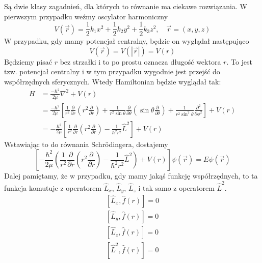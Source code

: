 Są dwie klasy zagadnień, dla których to równanie ma ciekawe rozwiązania.
W pierwszym przypadku weźmy oscylator harmoniczny
\begin{equation*}
	V(\vec{r})=\frac{1}{2} k_{1} x^{2}+\frac{1}{2} k_{2} y^{2}+\frac{1}{2} k_{3} z^{2}, \quad \vec{r} = (x, y, z)
\end{equation*}
W przypadku, gdy mamy potencjał centralny, będzie on wyglądał następująco
\begin{equation*}
	V(\vec{r}) = V(|\vec{r}|) = V(r)
\end{equation*}
Będziemy pisać $r$ bez strzałki i to po prostu oznacza długość wektora $r$. To jest tzw. potencjał centralny i w tym przypadku wygodnie jest przejść do współrzędnych sferycznych. Wtedy Hamiltonian będzie wyglądał tak:
\begin{equation*}
	\begin{split}
		H &=\frac{-\hbar^{2}}{2 \mu} \nabla^{2}+V(r) \\
		&= \frac{-\hbar^{2}}{2 \mu} \left[ \frac{1}{r^{2}} \frac{\partial}{\partial r} \left( r^{2} \frac{\partial}{\partial r} \right) + \frac{1}{r^{2} \sin \theta} \frac{\partial}{\partial \theta} \left( \sin \theta \frac{\partial}{\partial \theta} \right) + \frac{1}{r^{2} \sin^{2} \theta} \frac{\partial^{2}}{\partial \phi^{2}} \right] +V(r) \\
		&= -\frac{\hbar^2}{2\mu} \left[ \frac{1}{r^2} \frac{\partial}{\partial r} \left( r^2 \frac{\partial}{\partial r} \right) - \frac{1}{\hbar^2 r^2} \hat{L}^2 \right] + V(r)
	\end{split}
\end{equation*}
Wstawiając to do równania Schrödingera, dostajemy
\begin{equation*}
	\left[ -\frac{\hbar^2}{2\mu} \left( \frac{1}{r^2} \frac{\partial}{\partial r} \left( r^2 \frac{\partial}{\partial r} \right) - \frac{1}{\hbar^2 r^2} \hat{L}^2 \right) + V(r) \right] \psi(\vec{r}) = E \psi(\vec{r})
\end{equation*}
Dalej pamiętamy, że w przypadku, gdy mamy jakąś funkcję współrzędnych, to ta funkcja komutuje z operatorem $\hat{L}_x$, $\hat{L}_y$, $\hat{L}_z$ i tak samo z operatorem $\hat{L}^2$.
\begin{equation*}
	\begin{split}
		[\hat{L}_x, \hat{f}(r)] = 0 \\
		[\hat{L}_y, \hat{f}(r)] = 0 \\
		[\hat{L}_z, \hat{f}(r)] = 0 \\
		[\hat{L}^2, \hat{f}(r)] = 0 
	\end{split}
\end{equation*}
